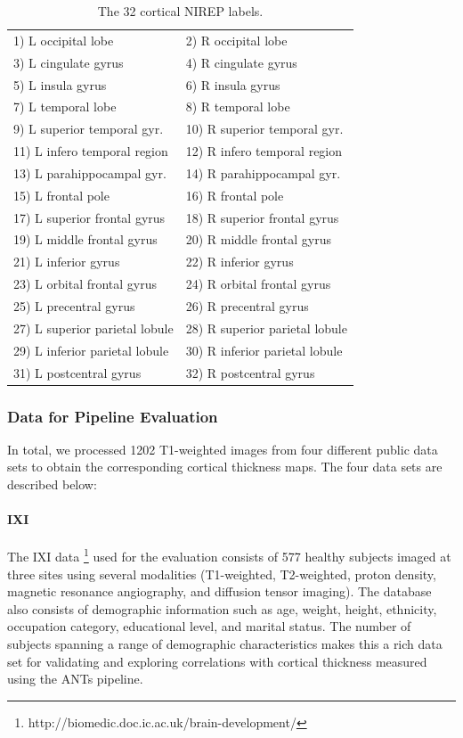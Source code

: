 \begin{table}
\centering
\begin{tabular*}{0.475\textwidth}{@{\extracolsep{\fill}} l l}
\toprule
  1) L occipital lobe & 2) R occipital lobe \\
  3) L cingulate gyrus & 4) R cingulate gyrus \\
  5) L insula gyrus & 6) R insula gyrus \\
  7) L temporal lobe & 8) R temporal lobe \\
  9) L superior temporal gyr. & 10) R superior temporal gyr. \\
  11) L infero temporal region & 12) R infero temporal region \\
  13) L parahippocampal gyr. & 14) R parahippocampal gyr. \\
  15) L frontal pole & 16) R frontal pole \\
  17) L superior frontal gyrus & 18) R superior frontal gyrus \\
  19) L middle frontal gyrus & 20) R middle frontal gyrus \\
  21) L inferior gyrus & 22) R inferior gyrus \\
  23) L orbital frontal gyrus & 24) R orbital frontal gyrus \\
  25) L precentral gyrus & 26) R precentral gyrus \\
  27) L superior parietal lobule & 28) R superior parietal lobule \\
  29) L inferior parietal lobule & 30) R inferior parietal lobule \\
  31) L postcentral gyrus & 32)   R postcentral gyrus \\  
\bottomrule
\end{tabular*}
\caption{The 32 cortical NIREP labels.}
\label{table:nirep_labels}
\end{table}

\subsubsection{Data for Pipeline Evaluation}
                         
In total, we processed 1202 T1-weighted images from four different
public data sets to obtain the corresponding cortical thickness maps.                           
The four data sets are described below: 
                                          
\paragraph{IXI}
The IXI data%
\footnote{
http://biomedic.doc.ic.ac.uk/brain-development/
}
 used for the evaluation consists of 577 healthy subjects imaged at three sites 
using several modalities (T1-weighted, T2-weighted, proton density, magnetic 
resonance angiography, and diffusion tensor imaging).  The 
database also consists of  demographic information such as age, weight,
height, ethnicity, occupation category, educational level, and marital status.
The number of subjects spanning a range of demographic characteristics makes
this a rich data set for validating and exploring correlations with cortical 
thickness measured using the ANTs pipeline.


